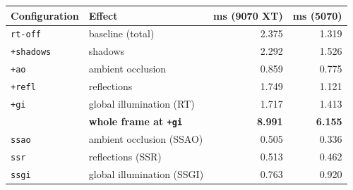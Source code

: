 \begin{tabular}{llrr}
\toprule
Configuration & Effect & ms (9070 XT) & ms (5070) \\
\midrule
\texttt{rt-off}   & baseline (total) & 2.375 & 1.319 \\
\texttt{+shadows} & shadows & 2.292 & 1.526 \\
\texttt{+ao} & ambient occlusion & 0.859 & 0.775 \\
\texttt{+refl} & reflections & 1.749 & 1.121 \\
\texttt{+gi} & global illumination (RT) & 1.717 & 1.413 \\
\midrule
 & \textbf{whole frame at \texttt{+gi}} & \textbf{8.991} & \textbf{6.155} \\
\midrule
\texttt{ssao} & ambient occlusion (SSAO) & 0.505 & 0.336 \\
\texttt{ssr} & reflections (SSR) & 0.513 & 0.462 \\
\texttt{ssgi} & global illumination (SSGI) & 0.763 & 0.920 \\
\bottomrule
\end{tabular}
